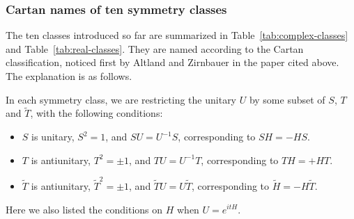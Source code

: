 \documentclass[12pt]{article}
\numberwithin{equation}{section}
\numberwithin{figure}{section}
\theoremstyle{remark}
\begin{document}
\subsubsection{Cartan names of ten symmetry classes}
The ten classes introduced so far are summarized in Table~\ref{tab:complex-classes}
and Table~\ref{tab:real-classes}.
They are named according to the Cartan classification,
noticed first by Altland and Zirnbauer in the paper cited above.
The explanation is as follows.

In each symmetry class, we are restricting the unitary $U$ by 
some subset of $S$, $T$ and $\tilde T$, with the following conditions:
\begin{itemize}
\item $S$ is unitary, $S^2=1$, and $SU=U^{-1}S$, corresponding to $SH=-HS$.
\item $T$ is antiunitary, $T^2=\pm1$, and $TU=U^{-1}T$, corresponding to $TH=+HT$.
\item $\tilde T$ is antiunitary, $\tilde T^2=\pm1$, and $\tilde TU=U\tilde T$, corresponding to $\tilde H=-H\tilde T$.
\end{itemize}
Here we also listed the conditions on $H$ when $U=e^{itH}$.
\end{document}
